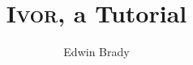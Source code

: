 \documentclass{article}
\newcommand{\Ivor}{\textsc{Ivor}}
\begin{document}
\title{\Ivor{}, a Tutorial}
\author{Edwin Brady}

 
\maketitle











\begin{small}



%

\end{small}
\end{document}
